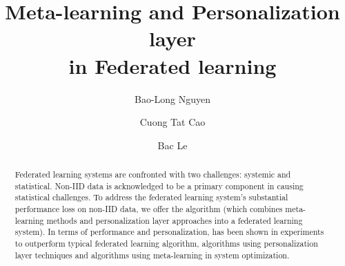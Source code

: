 \documentclass[runningheads]{llncs}
\begin{document}
%
\title{Meta-learning and Personalization layer \\in Federated learning}
%
%
\author{Bao-Long Nguyen \and
Cuong Tat Cao \and Bac Le}
%
%
%
\maketitle              %
%
\begin{abstract}
Federated learning systems are confronted with two challenges: systemic and statistical. Non-IID data is acknowledged to be a primary component in causing statistical challenges. To address the federated learning system's substantial performance loss on non-IID data, we offer the  algorithm (which combines meta-learning methods and personalization layer approaches into a federated learning system). In terms of performance and personalization,  has been shown in experiments to outperform typical federated learning algorithm, algorithms using personalization layer techniques and algorithms using meta-learning in system optimization.

\end{abstract}
%
%
%
\end{document}
